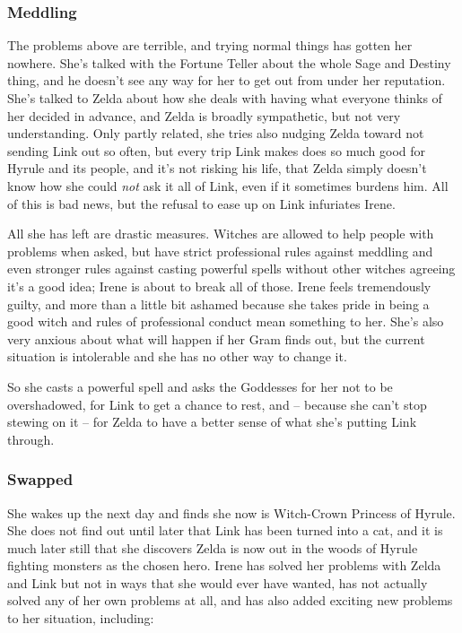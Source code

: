   \subsubsection{Meddling} The problems above are terrible, and trying normal things has gotten her nowhere. She's talked with the Fortune Teller about the whole Sage and Destiny thing, and he doesn't see any way for her to get out from under her reputation. She's talked to Zelda about how she deals with having what everyone thinks of her decided in advance, and Zelda is broadly sympathetic, but not very understanding. Only partly related, she tries also nudging Zelda toward not sending Link out so often, but every trip Link makes does so much good for Hyrule and its people, and it's not risking his life, that Zelda simply doesn't know how she could \emph{not} ask it all of Link, even if it sometimes burdens him. All of this is bad news, but the refusal to ease up on Link infuriates Irene.

  All she has left are drastic measures. Witches are allowed to help people with problems when asked, but have strict professional rules against meddling and even stronger rules against casting powerful spells without other witches agreeing it's a good idea; Irene is about to break all of those. Irene feels tremendously guilty, and more than a little bit ashamed because she takes pride in being a good witch and rules of professional conduct mean something to her. She's also very anxious about what will happen if her Gram finds out, but the current situation is intolerable and she has no other way to change it. 
  
  So she casts a powerful spell and asks the Goddesses for her not to be overshadowed, for Link to get a chance to rest, and -- because she can't stop stewing on it -- for Zelda to have a better sense of what she's putting Link through.

  \subsubsection{Swapped}She wakes up the next day and finds she now is Witch-Crown Princess of Hyrule. She does not find out until later that Link has been turned into a cat, and it is much later still that she discovers Zelda is now out in the woods of Hyrule fighting monsters as the chosen hero. Irene has solved her problems with Zelda and Link but not in ways that she would ever have wanted, has not actually solved any of her own problems at all, and has also added exciting new problems to her situation, including:    
  

